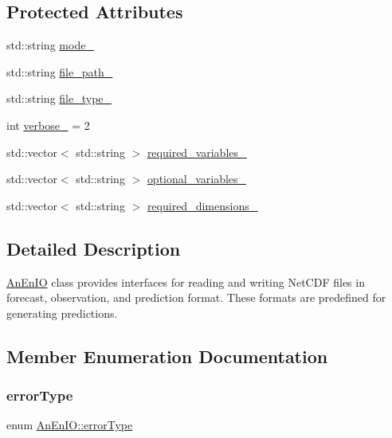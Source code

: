 \subsection*{Protected Attributes}
\begin{DoxyCompactItemize}
\item 
std\+::string \mbox{\hyperlink{class_an_en_i_o_a311891a4a1a6b3907246da853bc4e5c8}{mode\+\_\+}}
\item 
std\+::string \mbox{\hyperlink{class_an_en_i_o_ab892e06ca18be5e0c442c9e882e4475f}{file\+\_\+path\+\_\+}}
\item 
std\+::string \mbox{\hyperlink{class_an_en_i_o_addbfb455f641a394c14907163874d8fe}{file\+\_\+type\+\_\+}}
\item 
int \mbox{\hyperlink{class_an_en_i_o_a4f6abd007730e4a8f54d57cc3572bd9e}{verbose\+\_\+}} = 2
\item 
std\+::vector$<$ std\+::string $>$ \mbox{\hyperlink{class_an_en_i_o_a119dcb81d3811547f0e37d6c3752f0a7}{required\+\_\+variables\+\_\+}}
\item 
std\+::vector$<$ std\+::string $>$ \mbox{\hyperlink{class_an_en_i_o_a43f82ffbafbbda7ab8c9471d0bce70df}{optional\+\_\+variables\+\_\+}}
\item 
std\+::vector$<$ std\+::string $>$ \mbox{\hyperlink{class_an_en_i_o_adf42061631c78508bde00de7d22a65b4}{required\+\_\+dimensions\+\_\+}}
\end{DoxyCompactItemize}


\subsection{Detailed Description}
\mbox{\hyperlink{class_an_en_i_o}{An\+En\+IO}} class provides interfaces for reading and writing Net\+C\+DF files in forecast, observation, and prediction format. These formats are predefined for generating predictions. 

\subsection{Member Enumeration Documentation}
\mbox{\label{class_an_en_i_o_aa56bc1ec6610b86db4349bce20f9ead0}} 
\subsubsection{\texorpdfstring{error\+Type}{errorType}}
{\footnotesize\ttfamily enum \mbox{\hyperlink{class_an_en_i_o_aa56bc1ec6610b86db4349bce20f9ead0}{An\+En\+I\+O\+::error\+Type}}}

